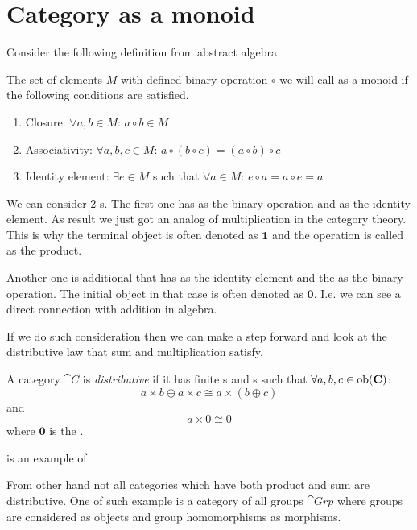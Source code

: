 \section{Category as a monoid}
Consider the following definition from abstract algebra
\begin{definition}[Monoid]
  \label{def:monoid}
  The set of elements $M$ with defined binary operation $\circ$ we will call
  as a monoid if the following conditions are satisfied.
  \begin{enumerate}
  \item Closure: $\forall a, b \in M$: $a \circ b \in M$
  \item Associativity: $\forall a, b, c \in M$:
    $a \circ \left( b \circ c \right) =
    \left( a \circ b \right) \circ c$
  \item Identity element: $\exists e \in M$ such that
    $\forall a \in M$: $e \circ a = a \circ e = a$
  \end{enumerate}
\end{definition}

We can consider 2 s. The first one has
 as the binary operation and
 as the identity element. As result we
just got an analog of multiplication in the category theory. This is why
the terminal object is often denoted as $\mathbf{1}$ and the operation
is called as the product. 

Another one is additional  that has
 as the identity element and the
 as the binary operation. The initial object in
that case  is often denoted as $\mathbf{0}$. I.e. we can see a direct
connection with addition in algebra.

If we do such consideration then we can make a step forward and look
at the distributive law that sum and multiplication satisfy.
\begin{definition}
\label{def:distributive_category}
A category $\cat{C}$ is \textit{distributive} if 
\cite{wiki:distributive_category}
it has finite
s and s such that 
$\forall a,b,c \in \mathrm{ob}(\mathbf{C})$:
\[
a \times b \oplus a \times c \cong a \times ( b \oplus c )
\]
and 
\[
a \times 0 \cong 0
\]
where $\mathbf{0}$ is the .
\end{definition} 

\begin{example}
\label{ex:distributive_category}
 is an example 
\cite{wiki:distributive_category}
of 

From other hand not all categories which have both product and sum are
distributive. One of such example is a category of all groups
\cite{wiki:distributive_category} 
$\cat{Grp}$ where groups are considered as objects and group
homomorphisms as morphisms. 
\end{example}


